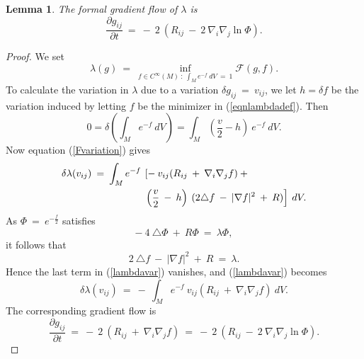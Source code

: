 \documentclass[12pt]{amsart}
\numberwithin{equation}{section}
\theoremstyle{plain}
\newtheorem{lemma}[equation]{Lemma}
\theoremstyle{definition}
\theoremstyle{remark}
\begin{document}
\begin{lemma}
The formal gradient flow of $\lambda$ 
is
\begin{equation}
\frac{\partial g_{ij}}{\partial t} \: = \:
- \: 2 \: \left( R_{ij} \: - \: 2 \: \nabla_i \nabla_j \ln \Phi 
\right).
\end{equation}
\end{lemma}
\begin{proof}
We set
\begin{equation}
\label{eqnlambdadef}
\lambda(g) \: = \: \inf_{f \in C^\infty(M) 
\: : \: \int_M e^{-f} \: dV \: = \: 1} 
{\mathcal F}(g, f).
\end{equation}
To calculate the variation in $\lambda$
due to a variation $\delta g_{ij} \: = \: v_{ij}$, 
we let $h=\delta f$ be the variation induced by letting $f$ be the 
minimizer in (\ref{eqnlambdadef}). Then 
\begin{equation}
0=\delta \left(\int_M e^{-f}\: dV\right) = \int_M \left(\frac{v}{2}-h\right)\:e^{-f}\:dV.
\end{equation}
Now  equation
(\ref{Fvariation}) gives
\begin{align} \label{lambdavar}
\delta \lambda(v_{ij}) 
\: = \: 
\int_M e^{-f} \: & \left[  - \: v_{ij} 
(R_{ij} \: + \: \nabla_i \nabla_j f) \: + \right. \\
& \left. \left( \frac{v}{2} \: - \: h \right) \: (2 \triangle f \: - \:
|\nabla f|^2 \: + \: R) \right] \: dV. \notag
\end{align}
As $\Phi \: = \: e^{-\frac{f}{2}}$ satisfies
\begin{equation}
- \: 4 \: \triangle \Phi \: + \: R \Phi \: = \: \lambda \Phi,
\end{equation}
it follows that
\begin{equation} \label{feqn}
2 \: \triangle f \: - \: | \nabla f|^2 \: + \: R \: = \: \lambda.
\end{equation}
Hence the last term in (\ref{lambdavar}) vanishes, and 
(\ref{lambdavar}) becomes
\begin{equation}
\delta \lambda(v_{ij}) 
\: = \: 
- \: \int_M e^{-f} \: v_{ij} 
(R_{ij} \: + \: \nabla_i \nabla_j f) \: dV.
\end{equation}
The corresponding gradient flow is
\begin{equation} \label{gradflow}
\frac{\partial g_{ij}}{\partial t} \: = \:
- \: 2 \: \left( R_{ij} \: + \: \nabla_i \nabla_j f
\right)\: = \:
- \: 2 \: \left( R_{ij} \: - \: 2 \: \nabla_i \nabla_j \ln \Phi 
\right). 
\end{equation}
\end{proof}
\end{document}
